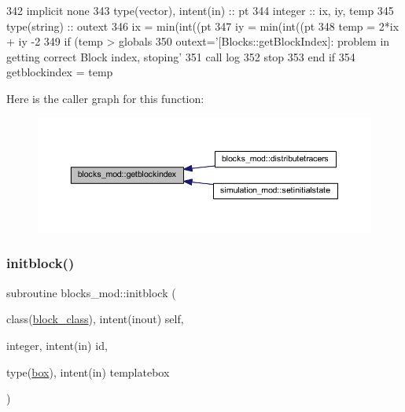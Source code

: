 \begin{DoxyCode}
342     \textcolor{keywordtype}{implicit none}
343     \textcolor{keywordtype}{type}(vector), \textcolor{keywordtype}{intent(in)} :: pt
344     \textcolor{keywordtype}{integer} :: ix, iy, temp
345     \textcolor{keywordtype}{type}(string) :: outext
346     ix = min(int((pt%
347     iy = min(int((pt%
348     temp = 2*ix + iy -2
349     \textcolor{keywordflow}{if} (temp > globals%
350         outext=\textcolor{stringliteral}{'[Blocks::getBlockIndex]: problem in getting correct Block index, stoping'}
351         \textcolor{keyword}{call }log%
352         stop
353 \textcolor{keywordflow}{    end if}
354     getblockindex = temp
\end{DoxyCode}
Here is the caller graph for this function\+:\nopagebreak
\begin{figure}[H]
\begin{center}
\leavevmode
\includegraphics[width=350pt]{namespaceblocks__mod_a62e8fb0d6b2535b4499c7a4d848c24ba_icgraph}
\end{center}
\end{figure}
\mbox{\label{namespaceblocks__mod_a534ca69b17b6f54ee07f995b02feff39}} 
\subsubsection{\texorpdfstring{initblock()}{initblock()}}
{\footnotesize\ttfamily subroutine blocks\+\_\+mod\+::initblock (\begin{DoxyParamCaption}\item[{class(\mbox{\hyperlink{structblocks__mod_1_1block__class}{block\+\_\+class}}), intent(inout)}]{self,  }\item[{integer, intent(in)}]{id,  }\item[{type(\mbox{\hyperlink{structgeometry__mod_1_1box}{box}}), intent(in)}]{templatebox }\end{DoxyParamCaption})\hspace{0.3cm}{\ttfamily [private]}}



